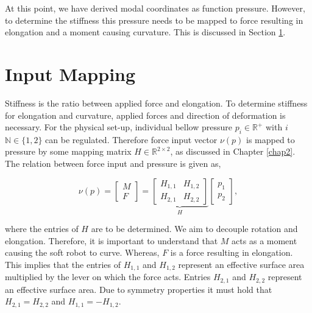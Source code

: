 At this point, we have derived modal coordinates as function pressure. However, to determine the stiffness this pressure needs to be mapped to force resulting in elongation and a moment causing curvature. This is discussed in Section \ref{sec3:InputMapping}.






\section{Input Mapping}
\label{sec3:InputMapping}

Stiffness is the ratio between applied force and elongation. To determine stiffness for elongation and curvature, applied forces and direction of deformation is necessary. For the physical set-up, individual bellow pressure $p_i \in \mathbb{R}^{+}$ with $i$ $\mathbb{N} \in \{1,2\}$ can be regulated. Therefore force input vector $\nu(p)$ is mapped to pressure by some mapping matrix $H \in \mathbb{R}^{2 \times 2}$, as discussed in Chapter \ref{chap2}. The relation between force input and pressure is given as, 

\begin{equation}
   \nu(p) =   \begin{bmatrix} M \\ F \end{bmatrix}     = \underbrace{\begin{bmatrix}  H_{1,1} & H_{1,2} \\ H_{2,1} & H_{2,2} \end{bmatrix}}_{H}         \begin{bmatrix}  p_1 \\ p_2 \end{bmatrix}, \label{eq3:H}
\end{equation}

where the entries of $H$ are to be determined. We aim to decouple rotation and elongation. Therefore, it is important to understand that $M$ acts as a moment causing the soft robot to curve. Whereas, $F$ is a force resulting in elongation. This implies that the entries of $H_{1,1}$ and $H_{1,2}$ represent an effective surface area multiplied by the lever on which the force acts. Entries $H_{2,1}$ and $H_{2,2}$ represent an effective surface area. Due to symmetry properties it must hold that $H_{2,1} = H_{2,2}$ and $H_{1,1} = -H_{1,2}$.


